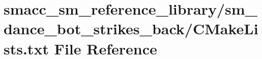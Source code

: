 \hypertarget{sm__reference__library_2sm__dance__bot__strikes__back_2CMakeLists_8txt}{}\section{smacc\+\_\+sm\+\_\+reference\+\_\+library/sm\+\_\+dance\+\_\+bot\+\_\+strikes\+\_\+back/\+C\+Make\+Lists.txt File Reference}
\label{sm__reference__library_2sm__dance__bot__strikes__back_2CMakeLists_8txt}
